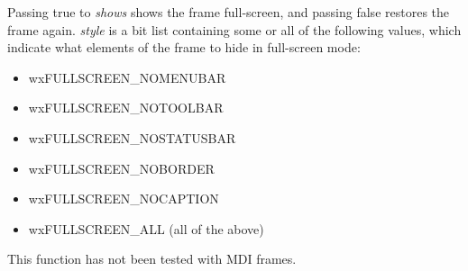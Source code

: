 



\label{wxframeshowfullscreen}


Passing true to {\it shows} shows the frame full-screen, and passing false restores the frame
again. {\it style} is a bit list containing some or all of the following values, which
indicate what elements of the frame to hide in full-screen mode:

\begin{itemize}\itemsep=0pt
\item wxFULLSCREEN\_NOMENUBAR
\item wxFULLSCREEN\_NOTOOLBAR
\item wxFULLSCREEN\_NOSTATUSBAR
\item wxFULLSCREEN\_NOBORDER
\item wxFULLSCREEN\_NOCAPTION
\item wxFULLSCREEN\_ALL (all of the above)
\end{itemize}

This function has not been tested with MDI frames.



